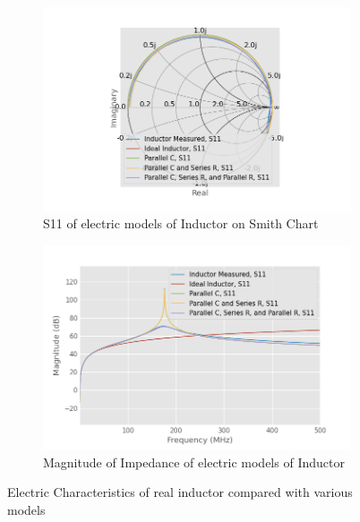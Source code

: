 \documentclass{article}
\begin{document}
\begin{figure}
    \centering
    \begin{subfigure}{\linewidth}
        \centering
        \includegraphics[width=\linewidth]{./pics/inductor_models_smith.png}
        \caption{S11 of electric models of Inductor on Smith Chart}
        \label{fig:inductor_compare_s}
    \end{subfigure}

    \begin{subfigure}{\linewidth}
        \centering
        \includegraphics[width=\linewidth]{./pics/inductor_models_db.png}
        \caption{Magnitude of Impedance of electric models of Inductor}
        \label{fig:inductor_compare_z}
    \end{subfigure}
    \caption{Electric Characteristics of real inductor compared with various models}
    \label{fig:inductor_compare}
\end{figure}
\end{document}
